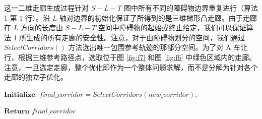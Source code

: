 \documentclass[UTF8,a4paper,12pt,fontset=none]{ctexart}
\theoremstyle{definition}
\theoremstyle{plain}
\theoremstyle{plain}
\theoremstyle{plain}
\begin{document}
这一二维走廊生成过程针对 $S-L-T$ 图中所有不同的障碍物边界重复进行（算法 1 第 1 行）。沿 $L$ 轴对边界的初始化保证了所得到的是三维梯形凸走廊。由于走廊在 $L$ 方向的长度由 $S-L-T$ 空间中障碍物的起始或终止给定，我们可以保证算法 1 所生成的所有走廊的安全性。注意，对于由障碍物划分的空间，我们通过 $SelectCorridors()$ 方法选出唯一包围参考轨迹的那部分空间。为了对 A 车让行，根据三维参考路径点，选取位于图 \ref{fig:f7} 和图 \ref{fig:f6} 中绿色区域内的走廊。
注意，一旦选定走廊，整个优化即作为一个整体问题求解，而不是分解为针对各个走廊的独立子优化。




\begin{algorithm}[htbp]
\caption{Piecewise 3D Convex Regions Generation}
\setcounter{AlgoLine}{0}
\LinesNumbered
{}


$\textbf{Initialize:}$ 
$final\_corridor = SelectCorridors(new\_corridor)$;

$\textbf{Return } final\_corridor$
\end{algorithm}
\end{document}
